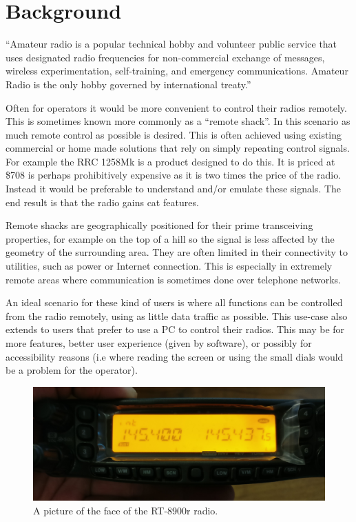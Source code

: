 \chapter{Background}

\begin{displayquote}
``Amateur radio is a popular technical hobby and volunteer public service that uses designated radio frequencies for non-commercial exchange of messages, wireless experimentation, self-training, and emergency communications.
Amateur Radio is the only hobby governed by international treaty.'' \cite{def_amateur_radio}
\end{displayquote}

Often for operators it would be more convenient to control their radios remotely. This is sometimes known more commonly as a ``remote shack''. In this scenario as much remote control as possible is desired. This is often achieved using existing commercial or home made solutions that rely on simply repeating control signals. For example the RRC 1258Mk is a product designed to do this. It is priced at \$708\cite{RRC_1258Mk} is perhaps prohibitively expensive as it is two times the price of the radio. Instead it would be preferable to understand and/or emulate these signals. The end result is that the radio gains \gls{cat}\cite{CAT} features.

Remote shacks are geographically positioned for their prime transceiving properties, for example on the top of a hill so the signal is less affected by the geometry of the surrounding area. They are often limited in their connectivity to utilities, such as power or Internet connection. This is especially in extremely remote areas where communication is sometimes done over telephone networks.

An ideal scenario for these kind of users is where all functions can be controlled from the radio remotely, using as little data traffic as possible. This use-case also extends to users that prefer to use a PC to control their radios. This may be for more features, better user experience (given by software), or possibly for accessibility reasons (i.e where reading the screen or using the small dials would be a problem for the operator).

\begin{figure}[H]
    \centering
    \includegraphics{img/radio_head.jpg}
    \caption[Picture of RT-8900r radio]{A picture of the face of the RT-8900r radio.}
    \label{fig:radio_head}
\end{figure}

